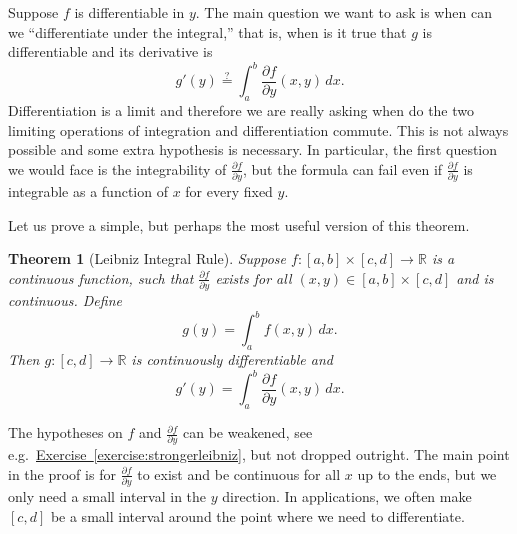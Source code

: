 \documentclass[12pt,openany]{book}
\newcommand{\R}{{\mathbb{R}}}
\newcommand{\myindex}[1]{#1\index{#1}}
\theoremstyle{plain}
\newtheorem{thm}{Theorem}[section]
\theoremstyle{remark}
\theoremstyle{definition}
\theoremstyle{exercise}
\theoremstyle{example}
\newcommand{\exerciseref}[1]{\hyperref[#1]{Exercise~\ref*{#1}}}
\begin{document}
Suppose $f$ is differentiable in $y$.  The main question we want to
ask is when can we ``differentiate under the integral,'' that is,
when is it true that $g$ is differentiable and its derivative is
\begin{equation*}
g'(y) \overset{?}{=} \int_a^b \frac{\partial f}{\partial y}(x,y) \,dx .
\end{equation*}
Differentiation is a limit and therefore we are really asking when do the
two limiting operations of integration and differentiation commute.
This is not always possible and some extra hypothesis is
necessary.  In particular, the first
question we would face is the integrability of
$\frac{\partial f}{\partial y}$, but the formula can fail even if
$\frac{\partial f}{\partial y}$ is integrable as a function of $x$ for every
fixed $y$.

Let us prove a simple, but perhaps the most useful version of this theorem.

\begin{thm}[\myindex{Leibniz Integral Rule}]
\label{thm:Leibnizrule}
Suppose $f \colon [a,b] \times [c,d] \to \R$ is a continuous function,
such that $\frac{\partial f}{\partial y}$ exists for all $(x,y) \in [a,b]
\times [c,d]$ and is continuous.  Define
\begin{equation*}
g(y) = \int_a^b f(x,y) \,dx .
\end{equation*}
Then $g \colon [c,d] \to \R$ is continuously differentiable and
\begin{equation*}
g'(y) = \int_a^b \frac{\partial f}{\partial y}(x,y) \,dx .
\end{equation*}
\end{thm}

The hypotheses on $f$ and $\frac{\partial f}{\partial y}$ can be
weakened, see e.g.\ \exerciseref{exercise:strongerleibniz},
but not dropped outright.
The main point in the proof is for
$\frac{\partial f}{\partial y}$ to exist and be continuous for all $x$
up to the ends, but we only need a small
interval in the $y$ direction.  In applications, we often make $[c,d]$ be a
small interval around the point where we need to differentiate.
\end{document}
